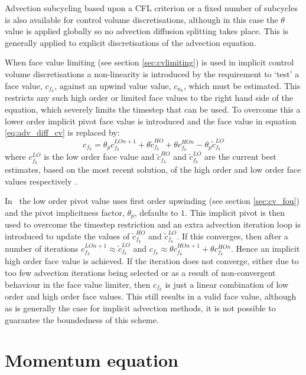 Advection subcycling based upon a CFL criterion or a fixed number of subcycles is also available for control volume discretisations, although in this case the $\theta$ value is applied globally so no advection diffusion splitting takes place.  This is generally applied to explicit discretisations of the advection equation.

When face value limiting (see section \ref{sec:cvlimiting}) is used in implicit control volume discretisations a non-linearity is introduced by the requirement to `test' a face value, $c_{f_k}$, against an upwind value value, $c_{u_k}$, which must be estimated.  This restricts any such high order or limited face values to the right hand side of the equation, which severely limits the timestep that can be used.  To overcome this a lower order implicit pivot face value is introduced and the face value in equation \ref{eq:adv_diff_cv} is replaced by:
\begin{equation}
c_{f_k} = \theta_p c_{f_k}^{LO n+1} + \theta \tilde{c}_{f_k}^{HO} + \theta c_{f_k}^{HO n} - \theta_p \tilde{c}_{f_k}^{LO}
\end{equation}
where $c_{f_k}^{LO}$ is the low order face value and $\tilde{c}_{f_k}^{HO}$ and $\tilde{c}_{f_k}^{LO}$ are the current best estimates, based on the most recent solution, of the high order and low order face values respectively \citep[see ][ for further details]{leveque_finite-volume_2002}.

In \fluidity\ the low order pivot value uses first order upwinding (see section \ref{sec:cv_fou}) and the pivot implicitness factor, $\theta_p$, defaults to $1$.  This implicit pivot is then used to overcome the timestep restriction and an extra advection iteration loop is introduced to update the values of $\tilde{c}_{f_k}^{HO}$ and $\tilde{c}_{f_k}^{LO}$.  If this converges, then after a number of iterations $c_{f_k}^{LO n+1} \approx \tilde{c}_{f_k}^{LO}$ and $c_{f_k} \approx \theta c_{f_k}^{HO n+1} + \theta c_{f_k}^{HO n}$.  Hence an implicit high order face value is achieved.  If the iteration does not converge, either due to too few advection iterations being selected or as a result of non-convergent behaviour in the face value limiter, then $c_{f_k}$ is just a linear combination of low order and high order face values.  This still results in a valid face value, although as is generally the case for implicit advection methods, it is not possible to guarantee the boundedness of this scheme.

\section{Momentum equation}

